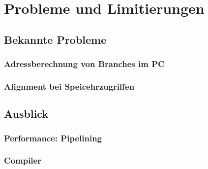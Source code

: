 \chapter{Probleme und Limitierungen} %
\label{Probleme} %

\section{Bekannte Probleme}
\subsection{Adressberechnung von Branches im PC}
\subsection{Alignment bei Speicehrzugriffen}

\section{Ausblick}
\subsection{Performance: Pipelining}
\subsection{Compiler}
